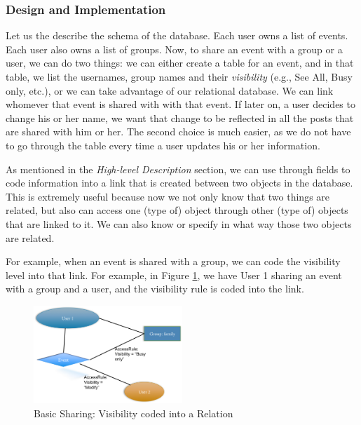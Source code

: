 \documentclass[a4paper]{article}
\begin{document}
\subsubsection{Design and Implementation}
Let us the describe the schema of the database. Each user owns a list of events. Each user also owns a list of groups. Now, to share an event with a group or a user, we can do two things: we can either create a table for an event, and in that table, we list the usernames, group names and their \emph{visibility} (e.g., See All, Busy only, etc.), or we can  take advantage of our relational database. We can link whomever that event is shared with with that event. If later on, a user decides to change his or her name, we want that change to be reflected in all the posts that are shared with him or her. The second choice is much easier, as we do not have to go through the table every time a user updates his or her information. 

As mentioned in the \emph{High-level Description} section, we can use through fields to code information into a link that is created between two objects in the database. This is extremely useful because now we not only know that two things are related, but also can access one (type of) object through other (type of) objects that are linked to it. We can also know or specify in what way those two objects are related. 

For example, when an event is shared with a group, we can code the visibility level into that link. For example, in Figure \ref{fig:sharing1}, we have User 1 sharing an event with a group and a user, and the visibility rule is coded into the link.

\begin{figure}[h]
\centering
\includegraphics[width=0.5\textwidth]{sharing1.png}
\caption{\label{fig:sharing1}Basic Sharing: Visibility coded into a Relation}
\end{figure}
\end{document}
